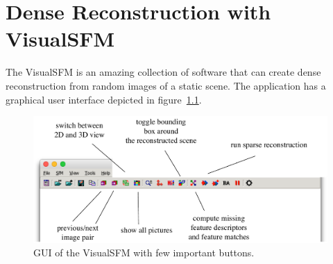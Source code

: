 \chapter{Dense Reconstruction with VisualSFM}
\label{visualsfm:reconstruction}
The VisualSFM is an amazing collection of software that can create dense reconstruction from random images of a static scene. The application has a graphical user interface depicted in figure~\ref{fig:visualsfm-gui}.
\begin{figure}[h]
	\begin{center}
		\includegraphics[keepaspectratio,width=\textwidth]{fig/visualsfm-gui.pdf}
	\end{center}
	\caption{GUI of the VisualSFM with few important buttons.}
	\label{fig:visualsfm-gui}
\end{figure}
